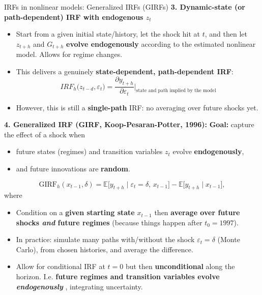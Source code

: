 \documentclass{beamer}
\begin{document}
\begin{frame}{IRFs in nonlinear models: Generalized IRFs (GIRFs)}
\scriptsize
\textbf{3. Dynamic-state (or path-dependent) IRF with endogenous $z_t$}
  \begin{itemize}
    \item Start from a given initial state/history, let the shock hit at $t$, and then let $z_{t+h}$ and $G_{t+h}$ \textbf{evolve endogenously} according to the estimated nonlinear model. Allows for regime changes.
    \item This delivers a genuinely \textbf{state-dependent, path-dependent IRF}:
    \[
      IRF_h\big(z_{t-d}, \varepsilon_t\big) = \frac{\partial y_{t+h}}{\partial \varepsilon_t}
      \Big|_{\text{state and path implied by the model}}
    \]
    \item However, this is still a \textbf{single-path} IRF: no averaging over future shocks yet.
  \end{itemize}

\textbf{4. Generalized IRF (GIRF, Koop-Pesaran-Potter, 1996):}
\textbf{Goal:} capture the effect of a shock when
\begin{itemize}
  \item future states (regimes) and transition variables $z_t$ evolve \textbf{endogenously},
  \item and future innovations are \textbf{random}.
\end{itemize}

\medskip

\[
  \mathrm{GIRF}_h(x_{t-1}, \delta)
  = \mathbb{E}\big[y_{t+h} \mid \varepsilon_t = \delta,\, x_{t-1}\big]
    - \mathbb{E}\big[y_{t+h} \mid x_{t-1}\big],
\]
where
\begin{itemize}
  \item Condition on a \textbf{given starting state} $x_{t-1}$ then \textbf{average over future shocks \emph{and} future regimes}  (because things happen after $t_0=1997$).
  \item In practice: simulate many paths with/without the shock $\varepsilon_t=\delta$ (Monte Carlo), from chosen histories, and average the difference.
        \item Allow for conditional IRF at $t=0$ but then\textbf{ unconditional} along the horizon. I.e. \textbf{future regimes and transition variables evolve \emph{endogenously} }, integrating uncertainty. 

\end{itemize}

\end{frame}
\end{document}
